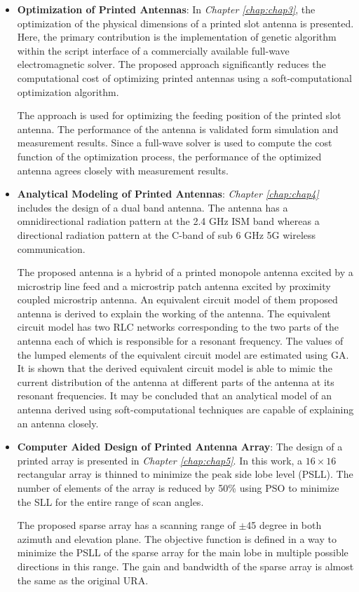 \begin{itemize}
\item \textbf{Optimization of Printed Antennas}: In \emph{Chapter \ref{chap:chap3}}, the optimization of the physical dimensions of a printed slot antenna is presented. Here, the primary contribution is the implementation of genetic algorithm within the script interface of a commercially available full-wave electromagnetic solver. The proposed approach significantly reduces the computational cost of optimizing printed antennas using a soft-computational optimization algorithm.

    The approach is used for optimizing the feeding position of the printed slot antenna. The performance of the antenna is validated form simulation and measurement results. Since a full-wave solver is used to compute the cost function of the optimization process, the performance of the optimized antenna agrees closely with measurement results.

\item \textbf{Analytical Modeling of Printed Antennas}: \emph{Chapter \ref{chap:chap4}} includes the design of a dual band antenna. The antenna has a omnidirectional radiation pattern at the 2.4 GHz ISM band whereas a directional radiation pattern at the C-band of sub 6 GHz 5G wireless communication.

    The proposed antenna is a hybrid of a printed monopole antenna excited by a microstrip line feed and a microstrip patch antenna excited by proximity coupled microstrip antenna. An equivalent circuit model of them proposed antenna is derived to explain the working of the antenna. The equivalent circuit model has two RLC networks corresponding to the two parts of the antenna each of which is responsible for a resonant frequency. The values of the lumped elements of the equivalent circuit model are estimated using GA. It is shown that the derived equivalent circuit model is able to mimic the current distribution of the antenna at different parts of the antenna at its resonant frequencies. It may be concluded that an analytical model of an antenna derived using soft-computational techniques are capable of explaining an antenna closely.

\item \textbf{Computer Aided Design of Printed Antenna Array}: The design of a printed array is presented in \emph{Chapter \ref{chap:chap5}}. In this work, a $16\times 16$ rectangular array is thinned to minimize the peak side lobe level (PSLL). The number of elements of the array is reduced by 50\% using PSO to minimize the SLL for the entire range of scan angles.

    The proposed sparse array has a scanning range of $\pm$45 degree in both azimuth and elevation plane. The objective function is defined in a way to minimize the PSLL of the sparse array for the main lobe in multiple possible directions in this range. The gain and bandwidth of the sparse array is almost the same as the original URA.
\end{itemize}

